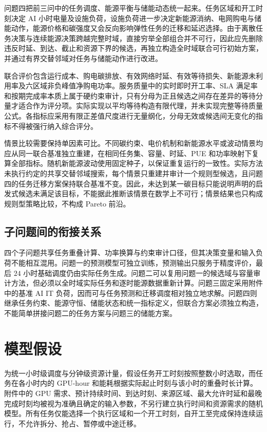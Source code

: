 \documentclass[withoutpreface,bwprint]{cumcmthesis}
\begin{document}
问题四把前三问中的任务调度、能源平衡与储能动态统一起来。任务区域和开工时刻决定 AI 小时电量及设施负荷，设施负荷进一步决定新能源消纳、电网购电与储能动作，能源价格和碳强度又会反向影响弹性任务的迁移和延迟选择。由于离散任务决策与连续能源决策跨越完整时域，直接穷举全部组合并不可行，因此应先删除违反时延、到达、截止和资源下界的候选，再独立构造全时域联合可行初始方案，并通过有界交替邻域对任务与储能动作进行改进。

联合评价包含运行成本、购电碳排放、有效网络时延、有效等待损失、新能源未利用率及六区域非负峰值净购电功率。服务质量中的实时即时开工率、SLA 满足率和按期完成率本质上属于硬约束审计，只有分母为正且候选之间存在差异的等待分量才适合作为评分项。实际实现以平均等待构造有限代理，并未实现完整等待质量公式。各指标应采用有限正差值尺度进行无量纲化，分母无效或候选间无变化的指标不得被强行纳入综合评分。

情景比较需要保持单因素可比。不同碳约束、电价机制和新能源水平或波动情景均应从同一联合基准独立重建，在相同任务集、容量、时延、PUE 和功率映射下复算全部指标。随机新能源波动使用固定种子，以保证重复运行的一致性。实际方法未执行约定的共享交替邻域搜索，每个情景只重建并审计一个规则型候选，且问题四的任务迁移方案保持联合基准不变。因此，未达到某一碳目标只能说明声明的启发式候选未满足该目标，不能据此推断该情景在数学上不可行；情景结果也只构成规则型策略比较，不构成 Pareto 前沿。

\subsection{子问题间的衔接关系}

四个子问题共享任务重叠计算、功率换算与约束审计口径，但其决策变量和输入负荷不能相互混用。问题一的预测模型可独立训练，预测输出只服务于精度评价，最后 $24$ 小时基础调度仍由实际任务生成。问题二可以复用问题一的候选域与容量审计方法，但必须以全时域实际任务和逐时能源数据重新计算。问题三固定采用附件中的基准 AI IT 负荷，因而可与任务预测和迁移调度相对独立地求解。问题四则继承任务约束、能源守恒、储能状态和统一指标定义，但联合方案必须独立构造，不能简单拼接问题二的任务方案与问题三的储能方案。

\section{模型假设}

为统一小时级调度与分钟级资源计量，假设任务开工时刻按照整数小时选取，而任务在各小时内的 GPU-hour 和能耗根据实际起止时刻与该小时的重叠时长计算。附件中的 GPU 需求、预计持续时间、到达时刻、来源区域、最大允许时延和最晚完成时刻均被视为准确且确定的输入参数，不另行建立执行时间和资源需求的随机模型。所有任务仅能选择一个执行区域和一个开工时刻，自开工至完成保持连续运行，不允许拆分、抢占、暂停或中途迁移。
\end{document}
